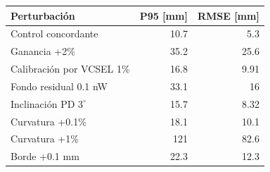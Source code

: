 \begin{tabular}{lrr}\toprule
Perturbación & P95 [mm] & RMSE [mm]\\\midrule
Control concordante & 10.7 & 5.3 \\
Ganancia +2\% & 35.2 & 25.6 \\
Calibración por VCSEL 1\% & 16.8 & 9.91 \\
Fondo residual 0.1 nW & 33.1 & 16 \\
Inclinación PD $3^\circ$ & 15.7 & 8.32 \\
Curvatura +0.1\% & 18.1 & 10.1 \\
Curvatura +1\% & 121 & 82.6 \\
Borde +0.1 mm & 22.3 & 12.3 \\
\bottomrule\end{tabular}
